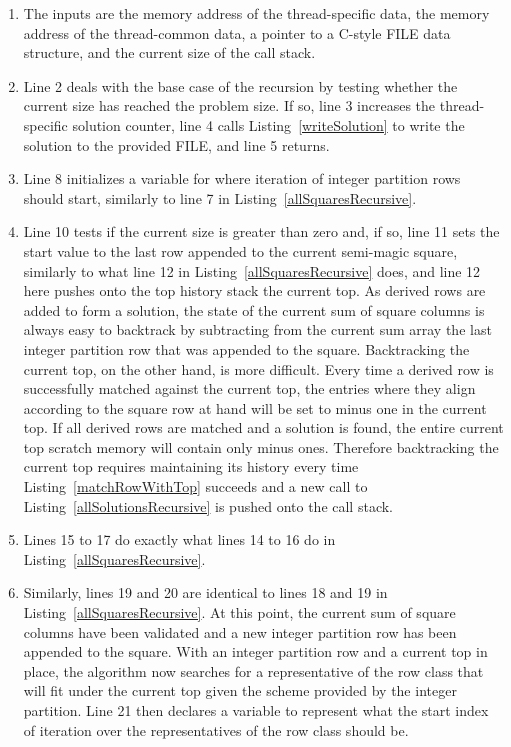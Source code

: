 \begin{enumerate}
\item The inputs are the memory address of the thread-specific data, the memory address of the thread-common data, a pointer to a C-style FILE data structure, and the current size of the call stack.
\item Line 2 deals with the base case of the recursion by testing whether the current size has reached the problem size. If so, line 3 increases the thread-specific solution counter, line 4 calls Listing~\ref{writeSolution} to write the solution to the provided FILE, and line 5 returns.
\addtocounter{enumi}{5}
\item Line 8 initializes a variable for where iteration of integer partition rows should start, similarly to line 7 in Listing~\ref{allSquaresRecursive}.
\addtocounter{enumi}{1}
\item Line 10 tests if the current size is greater than zero and, if so, line 11 sets the start value to the last row appended to the current semi-magic square, similarly to what line 12 in Listing~\ref{allSquaresRecursive} does, and line 12 here pushes onto the top history stack the current top. As derived rows are added to form a solution, the state of the current sum of square columns is always easy to backtrack by subtracting from the current sum array the last integer partition row that was appended to the square. Backtracking the current top, on the other hand, is more difficult. Every time a derived row is successfully matched against the current top, the entries where they align according to the square row at hand will be set to minus one in the current top. If all derived rows are matched and a solution is found, the entire current top scratch memory will contain only minus ones. Therefore backtracking the current top requires maintaining its history every time Listing~\ref{matchRowWithTop} succeeds and a new call to Listing~\ref{allSolutionsRecursive} is pushed onto the call stack.
\addtocounter{enumi}{4}
\item Lines 15 to 17 do exactly what lines 14 to 16 do in Listing~\ref{allSquaresRecursive}.
\addtocounter{enumi}{3}
\item Similarly, lines 19 and 20 are identical to lines 18 and 19 in Listing~\ref{allSquaresRecursive}. At this point, the current sum of square columns have been validated and a new integer partition row has been appended to the square. With an integer partition row and a current top in place, the algorithm now searches for a representative of the row class that will fit under the current top given the scheme provided by the integer partition. Line 21 then declares a variable to represent what the start index of iteration over the representatives of the row class should be.

\end{enumerate}
